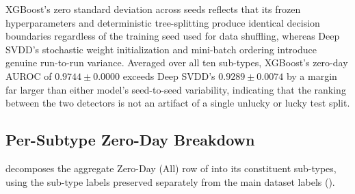 \documentclass[12pt, a4paper]{report}
\begin{document}
XGBoost's zero standard deviation across seeds reflects that its frozen hyperparameters and deterministic tree-splitting produce identical decision boundaries regardless of the training seed used for data shuffling, whereas Deep SVDD's stochastic weight initialization and mini-batch ordering introduce genuine run-to-run variance. Averaged over all ten sub-types, XGBoost's zero-day AUROC of $0.9744 \pm 0.0000$ exceeds Deep SVDD's $0.9289 \pm 0.0074$ by a margin far larger than either model's seed-to-seed variability, indicating that the ranking between the two detectors is not an artifact of a single unlucky or lucky test split.

\subsection{Per-Subtype Zero-Day Breakdown}\label{sec:statval_subtype}
 decomposes the aggregate Zero-Day (All) row of  into its constituent sub-types, using the sub-type labels preserved separately from the main dataset labels ().

\begin{table}[H]
\centering
\caption{Per-subtype zero-day breakdown, multi-seed mean $\pm$ std.}
\label{tab:subtype_breakdown}
\end{table}
\end{document}
